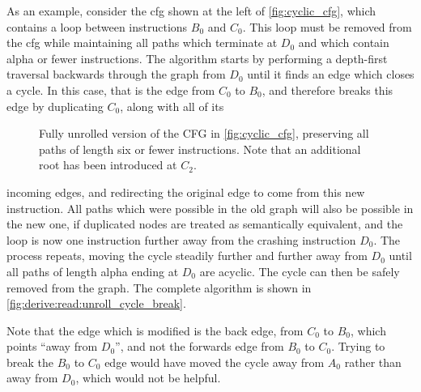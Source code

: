 As an example, consider the \gls{cfg} shown at the left of
\autoref{fig:cyclic_cfg}, which contains a loop between instructions
$B_0$ and $C_0$.  This loop must be removed from the \gls{cfg} while
maintaining all paths which terminate at $D_0$ and which contain
\gls{alpha} or fewer instructions.  The algorithm starts by performing
a depth-first traversal backwards through the graph from $D_0$ until
it finds an edge which closes a cycle.  In this case, that is the edge
from $C_0$ to $B_0$, and {\technique} therefore breaks this edge by
duplicating $C_0$, along with all of its
\begin{wrapfigure}{o}{3.9cm}
\begin{figgure}
\caption{Fully unrolled version of the CFG in
  \autoref{fig:cyclic_cfg}, preserving all paths of length six or
  fewer instructions.  Note that an additional root has been
  introduced at $C_2$.}
\label{fig:unrolled_cyclic_cfg}
\end{figgure}
\vspace{-24pt}
\end{wrapfigure}
incoming edges, and redirecting the original edge to come from this
new instruction.  All paths which were possible in the old graph will
also be possible in the new one, if duplicated nodes are treated as
semantically equivalent, and the loop is now one instruction further
away from the crashing instruction $D_0$.  The process repeats, moving
the cycle steadily further and further away from $D_0$ until all paths
of length \gls{alpha} ending at $D_0$ are acyclic.  The cycle can then
be safely removed from the graph.  The complete algorithm is shown in
\autoref{fig:derive:read:unroll_cycle_break}.

Note that the edge which is modified is the back edge, from $C_0$ to
$B_0$, which points ``away from $D_0$'', and not the forwards edge
from $B_0$ to $C_0$.  Trying to break the $B_0$ to $C_0$ edge would
have moved the cycle away from $A_0$ rather than away from $D_0$,
which would not be helpful.

